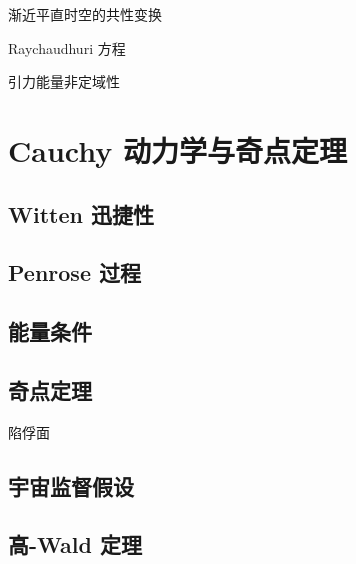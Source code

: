 渐近平直时空的共性变换
 
Raychaudhuri 方程

引力能量非定域性

\chapter{Cauchy 动力学与奇点定理}
\section{Witten 迅捷性}
\section{Penrose 过程}
\section{能量条件}
\section{奇点定理}
陷俘面
\section{宇宙监督假设}
\section{高-Wald 定理}


